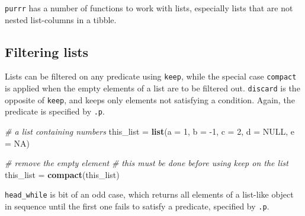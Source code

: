 \documentclass[]{book}
\newenvironment{Shaded}{}{}
\newcommand{\CommentTok}[1]{\textcolor[rgb]{0.38,0.63,0.69}{\textit{#1}}}
\newcommand{\ControlFlowTok}[1]{\textcolor[rgb]{0.00,0.44,0.13}{\textbf{#1}}}
\newcommand{\DataTypeTok}[1]{\textcolor[rgb]{0.56,0.13,0.00}{#1}}
\newcommand{\DecValTok}[1]{\textcolor[rgb]{0.25,0.63,0.44}{#1}}
\newcommand{\KeywordTok}[1]{\textcolor[rgb]{0.00,0.44,0.13}{\textbf{#1}}}
\newcommand{\NormalTok}[1]{#1}
\newcommand{\OperatorTok}[1]{\textcolor[rgb]{0.40,0.40,0.40}{#1}}
\newcommand{\OtherTok}[1]{\textcolor[rgb]{0.00,0.44,0.13}{#1}}
\newcommand{\StringTok}[1]{\textcolor[rgb]{0.25,0.44,0.63}{#1}}
\begin{document}
\texttt{purrr} has a number of functions to work with lists, especially lists that are not nested list-columns in a tibble.

\hypertarget{filtering-lists}{%
\subsection{Filtering lists}\label{filtering-lists}}

Lists can be filtered on any predicate using \texttt{keep}, while the special case \texttt{compact} is applied when the empty elements of a list are to be filtered out. \texttt{discard} is the opposite of \texttt{keep}, and keeps only elements not satisfying a condition. Again, the predicate is specified by \texttt{.p}.

\begin{Shaded}
\begin{Highlighting}[]
\CommentTok{# a list containing numbers}
\NormalTok{this_list =}\StringTok{ }\KeywordTok{list}\NormalTok{(}\DataTypeTok{a =} \DecValTok{1}\NormalTok{, }\DataTypeTok{b =} \DecValTok{-1}\NormalTok{, }\DataTypeTok{c =} \DecValTok{2}\NormalTok{, }\DataTypeTok{d =} \OtherTok{NULL}\NormalTok{, }\DataTypeTok{e =} \OtherTok{NA}\NormalTok{)}

\CommentTok{# remove the empty element}
\CommentTok{# this must be done before using keep on the list}
\NormalTok{this_list =}\StringTok{ }\KeywordTok{compact}\NormalTok{(this_list)}
\end{Highlighting}
\end{Shaded}

\begin{Shaded}
\end{Shaded}

\texttt{head\_while} is bit of an odd case, which returns all elements of a list-like object in sequence until the first one fails to satisfy a predicate, specified by \texttt{.p}.
\end{document}
